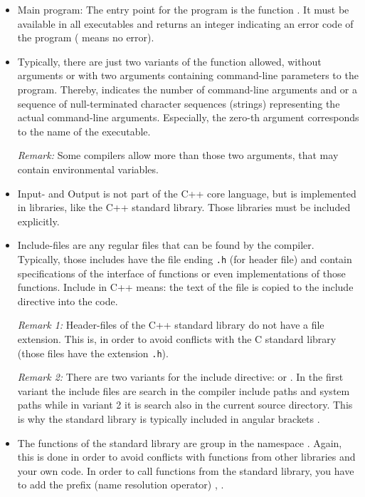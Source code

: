 \begin{itemize}
  \item Main program: The entry point for the program is the function . It must be available in all executables and returns an
        integer indicating an error code of the program ( means no error).

  \item Typically, there are just two variants of the  function allowed, without arguments or with two arguments containing
        command-line parameters to the program. Thereby,  indicates the number of command-line arguments and 
        or  a sequence of null-terminated character sequences (strings) representing the actual command-line arguments.
        Especially, the zero-th argument  corresponds to the name of the executable.

        \textit{Remark:} Some compilers allow more than those two arguments, that may contain environmental variables.
  \item Input- and Output is not part of the C++ core language, but is implemented in libraries, like the C++ standard library. Those libraries
        must be included explicitly.

  \item Include-files are any regular files that can be found by the compiler. Typically, those includes have the file ending \texttt{.h}
        (for header file) and contain specifications of the interface of functions or even implementations of those functions.
        Include in C++ means: the text of the file is copied to the include directive  into the code.

        \textit{Remark 1:} Header-files of the C++ standard library do not have a file extension. This is, in order to avoid conflicts with the
        C standard library (those files have the extension \texttt{.h}).

        \textit{Remark 2:} There are two variants for the include directive:  or . In the
        first variant the include files are search in the compiler include paths and system paths while in variant 2 it is search also in the
        current source directory. This is why the standard library is typically included in angular brackets .

  \item The functions of the standard library are group in the namespace . Again, this is done in order to avoid conflicts with functions
        from other libraries and your own code. In order to call functions from the standard library, you have to add the prefix
        (name resolution operator) \cpp{::}, \eg {}.


\end{itemize}
